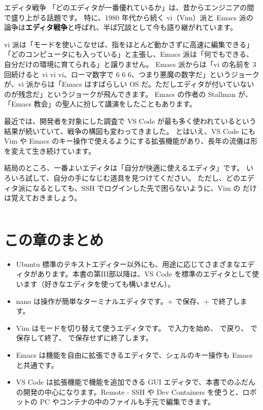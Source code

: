 \begin{column}{エディタ戦争}
  「どのエディタが一番優れているか」は、昔からエンジニアの間で盛り上がる話題です。
  特に、1980 年代から続く vi（Vim）派と Emacs 派の論争は\textbf{エディタ戦争}と呼ばれ、半ば冗談として今も語り継がれています。

  vi 派は「モードを使いこなせば、指をほとんど動かさずに高速に編集できる」「どのコンピュータにも入っている」と主張し、Emacs 派は「何でもできる、自分だけの環境に育てられる」と譲りません。
  Emacs 派からは「vi の名前を 3 回続けると vi vi vi、ローマ数字で 6 6 6、つまり悪魔の数字だ」というジョークが、vi 派からは「Emacs はすばらしい OS だ。ただしエディタが付いていないのが残念だ」というジョークが飛んできます。
  Emacs の作者の Stallman が、「Emacs 教会」の聖人に扮して講演をしたこともあります。

  最近では、開発者を対象にした調査で VS Code が最も多く使われているという結果が続いていて、戦争の構図も変わってきました。
  とはいえ、VS Code にも Vim や Emacs のキー操作で使えるようにする拡張機能があり、長年の流儀は形を変えて生き続けています。

  結局のところ、一番よいエディタは「自分が快適に使えるエディタ」です。
  いろいろ試して、自分の手になじむ道具を見つけてください。
  ただし、どのエディタ派になるとしても、SSH でログインした先で困らないように、Vim の  だけは覚えておきましょう。
\end{column}

\section*{この章のまとめ}

\begin{itemize}
  \item Ubuntu 標準のテキストエディター以外にも、用途に応じてさまざまなエディタがあります。本書の第III部以降は、VS Code を標準のエディタとして使います（好きなエディタを使っても構いません）。
  \item nano は操作が簡単なターミナルエディタです。+ で保存、+ で終了します。
  \item Vim はモードを切り替えて使うエディタです。 で入力を始め、 で戻り、 で保存して終了、 で保存せずに終了します。
  \item Emacs は機能を自由に拡張できるエディタで、シェルのキー操作も Emacs と共通です。
  \item VS Code は拡張機能で機能を追加できる GUI エディタで、本書でのふだんの開発の中心になります。Remote - SSH や Dev Containers を使うと、ロボットの PC やコンテナの中のファイルも手元で編集できます。
\end{itemize}
